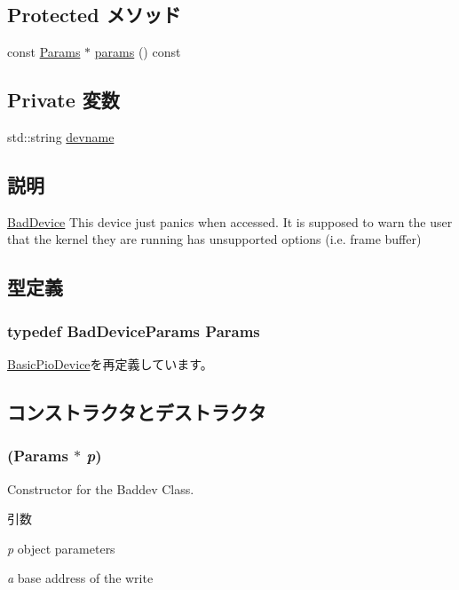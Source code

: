 \subsection*{Protected メソッド}
\begin{DoxyCompactItemize}
\item 
const \hyperlink{classBadDevice_af753d1777865d13ff644f3ce8b944d6b}{Params} $\ast$ \hyperlink{classBadDevice_acd3c3feb78ae7a8f88fe0f110a718dff}{params} () const 
\end{DoxyCompactItemize}
\subsection*{Private 変数}
\begin{DoxyCompactItemize}
\item 
std::string \hyperlink{classBadDevice_aa18b4566b08001962567d1424ad61b8c}{devname}
\end{DoxyCompactItemize}


\subsection{説明}
\hyperlink{classBadDevice}{BadDevice} This device just panics when accessed. It is supposed to warn the user that the kernel they are running has unsupported options (i.e. frame buffer) 

\subsection{型定義}
\hypertarget{classBadDevice_af753d1777865d13ff644f3ce8b944d6b}{
\subsubsection[{Params}]{\setlength{\rightskip}{0pt plus 5cm}typedef BadDeviceParams {\bf Params}}}
\label{classBadDevice_af753d1777865d13ff644f3ce8b944d6b}


\hyperlink{classBasicPioDevice_a2845515ac6467f10540747053c8a0449}{BasicPioDevice}を再定義しています。

\subsection{コンストラクタとデストラクタ}
\hypertarget{classBadDevice_a53ea8f590f0b05fb193659b62cfa4b80}{
\subsubsection[{BadDevice}]{ ({\bf Params} $\ast$ {\em p})}}
\label{classBadDevice_a53ea8f590f0b05fb193659b62cfa4b80}
Constructor for the Baddev Class. 
\begin{DoxyParams}{引数}
\item[{\em p}]object parameters \item[{\em a}]base address of the write \end{DoxyParams}



